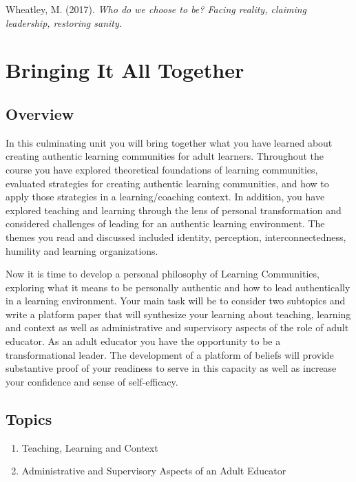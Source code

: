 \documentclass[
]{book}
\begin{document}
Wheatley, M. (2017). \emph{Who do we choose to be? Facing reality, claiming leadership, restoring sanity. }

\hypertarget{bringing-it-all-together}{%
\chapter{Bringing It All Together}\label{bringing-it-all-together}}

\hypertarget{overview-9}{%
\section*{Overview}\label{overview-9}}

In this culminating unit you will bring together what you have learned about creating authentic learning communities for adult learners. Throughout the course you have explored theoretical foundations of learning communities, evaluated strategies for creating authentic learning communities, and how to apply those strategies in a learning/coaching context. In addition, you have explored teaching and learning through the lens of personal transformation and considered challenges of leading for an authentic learning environment. The themes you read and discussed included identity, perception, interconnectedness, humility and learning organizations.

Now it is time to develop a personal philosophy of Learning Communities, exploring what it means to be personally authentic and how to lead authentically in a learning environment. Your main task will be to consider two subtopics and write a platform paper that will synthesize your learning about teaching, learning and context as well as administrative and supervisory aspects of the role of adult educator. As an adult educator you have the opportunity to be a transformational leader. The development of a platform of beliefs will provide substantive proof of your readiness to serve in this capacity as well as increase your confidence and sense of self-efficacy.

\hypertarget{topics-9}{%
\section*{Topics}\label{topics-9}}

\begin{enumerate}
\def\labelenumi{\arabic{enumi}.}
\item
  Teaching, Learning and Context
\item
  Administrative and Supervisory Aspects of an Adult Educator
\end{enumerate}
\end{document}
